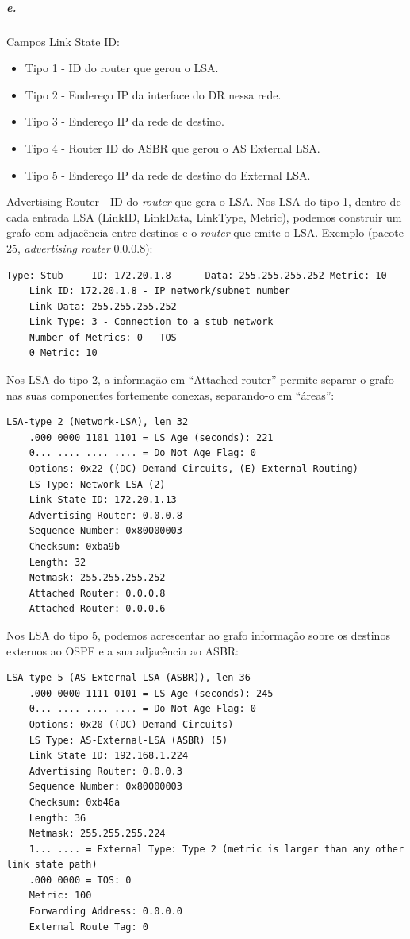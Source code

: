 \subparagraph{e.} Campos Link State ID:
\begin{itemize}
\item Tipo 1 - ID do router que gerou o LSA.
\item Tipo 2 - Endereço IP da interface do DR nessa rede.
\item Tipo 3 - Endereço IP da rede de destino.
\item Tipo 4 - Router ID do ASBR que gerou o AS External LSA.
\item Tipo 5 - Endereço IP da rede de destino do External LSA.
\end{itemize}
Advertising Router - ID do \emph{router} que gera o LSA.
Nos LSA do tipo 1, dentro de cada entrada LSA (LinkID, LinkData,
LinkType, Metric), podemos construir um grafo com adjacência entre
destinos e o \emph{router} que emite o LSA. Exemplo (pacote 25, \emph{advertising
router} 0.0.0.8):
\begin{verbatim}
Type: Stub     ID: 172.20.1.8      Data: 255.255.255.252 Metric: 10
    Link ID: 172.20.1.8 - IP network/subnet number
    Link Data: 255.255.255.252
    Link Type: 3 - Connection to a stub network
    Number of Metrics: 0 - TOS
    0 Metric: 10
\end{verbatim}
Nos LSA do tipo 2, a informação em ``Attached router'' permite separar
o grafo nas suas componentes fortemente conexas, separando-o em
``áreas'':
\begin{verbatim}
LSA-type 2 (Network-LSA), len 32
    .000 0000 1101 1101 = LS Age (seconds): 221
    0... .... .... .... = Do Not Age Flag: 0
    Options: 0x22 ((DC) Demand Circuits, (E) External Routing)
    LS Type: Network-LSA (2)
    Link State ID: 172.20.1.13
    Advertising Router: 0.0.0.8
    Sequence Number: 0x80000003
    Checksum: 0xba9b
    Length: 32
    Netmask: 255.255.255.252
    Attached Router: 0.0.0.8
    Attached Router: 0.0.0.6
\end{verbatim}
Nos LSA do tipo 5, podemos acrescentar ao grafo informação sobre os
destinos externos ao OSPF e a sua adjacência ao ASBR:
\begin{verbatim}
LSA-type 5 (AS-External-LSA (ASBR)), len 36
    .000 0000 1111 0101 = LS Age (seconds): 245
    0... .... .... .... = Do Not Age Flag: 0
    Options: 0x20 ((DC) Demand Circuits)
    LS Type: AS-External-LSA (ASBR) (5)
    Link State ID: 192.168.1.224
    Advertising Router: 0.0.0.3
    Sequence Number: 0x80000003
    Checksum: 0xb46a
    Length: 36
    Netmask: 255.255.255.224
    1... .... = External Type: Type 2 (metric is larger than any other link state path)
    .000 0000 = TOS: 0
    Metric: 100
    Forwarding Address: 0.0.0.0
    External Route Tag: 0
\end{verbatim}

